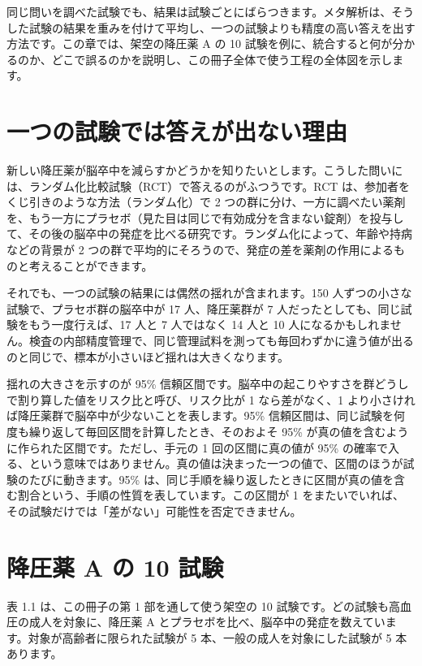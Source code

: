 \begin{chapintro}
同じ問いを調べた試験でも、結果は試験ごとにばらつきます。メタ解析は、そうした試験の結果を重みを付けて平均し、一つの試験よりも精度の高い答えを出す方法です。この章では、架空の降圧薬 A の 10 試験を例に、統合すると何が分かるのか、どこで誤るのかを説明し、この冊子全体で使う工程の全体図を示します。
\end{chapintro}

\section{一つの試験では答えが出ない理由}
\label{sec:01-1}

新しい降圧薬が脳卒中を減らすかどうかを知りたいとします。こうした問いには、ランダム化比較試験（RCT）で答えるのがふつうです。RCT は、参加者をくじ引きのような方法（ランダム化）で 2 つの群に分け、一方に調べたい薬剤を、もう一方にプラセボ（見た目は同じで有効成分を含まない錠剤）を投与して、その後の脳卒中の発症を比べる研究です。ランダム化によって、年齢や持病などの背景が 2 つの群で平均的にそろうので、発症の差を薬剤の作用によるものと考えることができます。

それでも、一つの試験の結果には偶然の揺れが含まれます。150 人ずつの小さな試験で、プラセボ群の脳卒中が 17 人、降圧薬群が 7 人だったとしても、同じ試験をもう一度行えば、17 人と 7 人ではなく 14 人と 10 人になるかもしれません。検査の内部精度管理で、同じ管理試料を測っても毎回わずかに違う値が出るのと同じで、標本が小さいほど揺れは大きくなります。

揺れの大きさを示すのが 95\% 信頼区間です。脳卒中の起こりやすさを群どうしで割り算した値をリスク比と呼び、リスク比が 1 なら差がなく、1 より小さければ降圧薬群で脳卒中が少ないことを表します。95\% 信頼区間は、同じ試験を何度も繰り返して毎回区間を計算したとき、そのおよそ 95\% が真の値を含むように作られた区間です。ただし、手元の 1 回の区間に真の値が 95\% の確率で入る、という意味ではありません。真の値は決まった一つの値で、区間のほうが試験のたびに動きます。95\% は、同じ手順を繰り返したときに区間が真の値を含む割合という、手順の性質を表しています。この区間が 1 をまたいでいれば、その試験だけでは「差がない」可能性を否定できません。

\section{降圧薬 A の 10 試験}
\label{sec:01-2}

表 1.1 は、この冊子の第 1 部を通して使う架空の 10 試験です。どの試験も高血圧の成人を対象に、降圧薬 A とプラセボを比べ、脳卒中の発症を数えています。対象が高齢者に限られた試験が 5 本、一般の成人を対象にした試験が 5 本あります。


